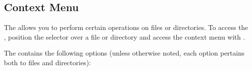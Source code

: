 \subsection{\label{ref:Contextmenu}\label{ref:PartIISectionFM}Context Menu}

The  allows you to perform certain operations on files or
directories.  To access the , position the selector over a file
or directory and access the context menu with \ActionStdContext{}.\\


The  contains the following options (unless otherwise noted,
each option pertains both to files and directories):

